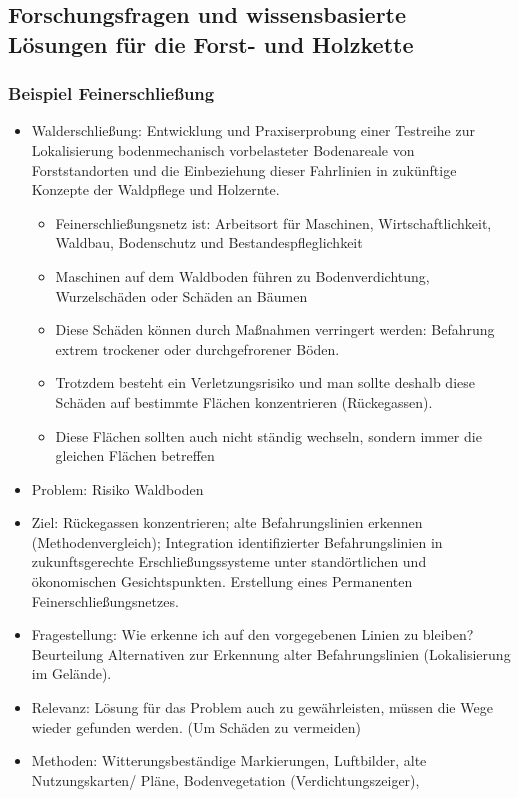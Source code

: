 \documentclass[12pt]{article}
\begin{document}
\subsection*{Forschungsfragen und wissensbasierte Lösungen für die Forst- und Holzkette}
\subsubsection*{Beispiel Feinerschließung}
\begin{itemize}
 \item Walderschließung: Entwicklung und Praxiserprobung einer Testreihe zur Lokalisierung bodenmechanisch vorbelasteter Bodenareale
       von Forststandorten und die Einbeziehung dieser Fahrlinien in zukünftige Konzepte der Waldpflege und Holzernte.
\begin{itemize}
 \item Feinerschließungsnetz ist: Arbeitsort für Maschinen, Wirtschaftlichkeit, Waldbau, Bodenschutz und Bestandespfleglichkeit
 \item Maschinen auf dem Waldboden führen zu Bodenverdichtung, Wurzelschäden oder Schäden an Bäumen
 \item Diese Schäden können durch Maßnahmen verringert werden: Befahrung extrem trockener oder durchgefrorener Böden.
 \item Trotzdem besteht ein Verletzungsrisiko und man sollte deshalb diese Schäden auf bestimmte Flächen konzentrieren (Rückegassen).
 \item Diese Flächen sollten auch nicht ständig wechseln, sondern immer die gleichen Flächen betreffen
\end{itemize}
\item Problem: Risiko Waldboden
\item Ziel: Rückegassen konzentrieren; alte Befahrungslinien erkennen (Methodenvergleich); Integration identifizierter Befahrungslinien in
      zukunftsgerechte Erschließungssysteme unter standörtlichen und ökonomischen Gesichtspunkten. Erstellung eines Permanenten Feinerschließungsnetzes.
\item Fragestellung: Wie erkenne ich auf den vorgegebenen Linien zu bleiben?
                     Beurteilung Alternativen zur Erkennung alter Befahrungslinien (Lokalisierung im Gelände).
\item Relevanz: Lösung für das Problem auch zu gewährleisten, müssen die Wege wieder gefunden werden. (Um Schäden zu vermeiden)
\item Methoden: Witterungsbeständige Markierungen, Luftbilder, alte Nutzungskarten/ Pläne, Bodenvegetation (Verdichtungszeiger),

\end{itemize}
\end{document}
